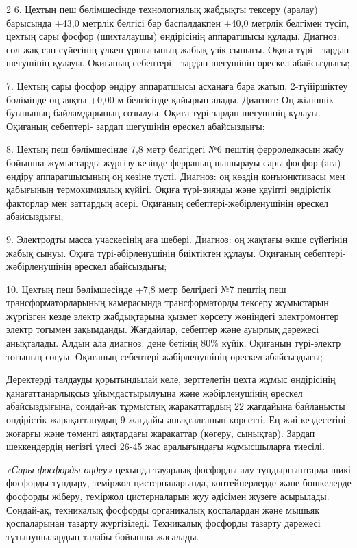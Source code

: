 \begin{multicols}{2}
6. Цехтың пеш бөлімшесінде технологиялық жабдықты тексеру (аралау)
барысында +43,0 метрлік белгісі бар баспалдақпен +40,0 метрлік белгімен
түсіп, цехтың сары фосфор (шихталаушы) өндірісінің аппаратшысы құлады.
Диагноз: сол жақ сан сүйегінің үлкен ұршығының жабық үзік сынығы. Оқиға
түрі - зардап шегушінің құлауы. Оқиғаның себептері - зардап шегушінің
өрескел абайсыздығы;

7. Цехтың сары фосфор өндіру аппаратшысы асханаға бара жатып,
2-түйіршіктеу бөлімінде оң аяқты +0,00 м белгісінде қайырып алады.
Диагноз: Оң жіліншік буынының байламдарының созылуы. Оқиға түрі-зардап
шегушінің құлауы. Оқиғаның себептері- зардап шегушінің өрескел
абайсыздығы;

8. Цехтың пеш бөлімшесінде 7,8 метр белгідегі №6 пештің ферроледкасын
жабу бойынша жұмыстарды жүргізу кезінде ферраның шашырауы сары фосфор
(аға) өндіру аппаратшысының оң көзіне түсті. Диагноз: оң көздің
конъюнктивасы мен қабығының термохимиялық күйігі. Оқиға түрі-зиянды және
қауіпті өндірістік факторлар мен заттардың әсері. Оқиғаның
себептері-жәбірленушінің өрескел абайсыздығы;

9. Электродты масса учаскесінің аға шебері. Диагноз: оң жақтағы өкше
сүйегінің жабық сынуы. Оқиға түрі-әбірленушінің биіктіктен құлауы.
Оқиғаның себептері-жәбірленушінің өрескел абайсыздығы;

10. Цехтың пеш бөлімшесінде +7,8 метр белгідегі №7 пештің пеш
трансформаторларының камерасында трансформаторды тексеру жұмыстарын
жүргізген кезде электр жабдықтарына қызмет көрсету жөніндегі
электромонтер электр тогымен зақымданды. Жағдайлар, себептер және
ауырлық дәрежесі анықталады. Алдын ала диагноз: дене бетінің 80\% күйік.
Оқиғаның түрі-электр тогының соғуы. Оқиғаның себептері-жәбірленушінің
өрескел абайсыздығы;

Деректерді талдауды қорытындылай келе, зерттелетін цехта жұмыс
өндірісінің қанағаттанарлықсыз ұйымдастырылуына және жәбірленушінің
өрескел абайсыздығына, сондай-ақ тұрмыстық жарақаттардың 22 жағдайына
байланысты өндірістік жарақаттанудың 9 жағдайы анықталғанын көрсетті. Ең
жиі кездесетіні-жоғарғы және төменгі аяқтардағы жарақаттар (көгеру,
сынықтар). Зардап шеккендердің негізгі үлесі 26-45 жас аралығындағы
жұмысшыларға тиесілі.

\emph{«Сары фосфорды өңдеу»} цехында тауарлық фосфорды алу
тұндырғыштарда шикі фосфорды тұндыру, теміржол цистерналарында,
контейнерлерде және бөшкелерде фосфорды жіберу, теміржол цистерналарын
жуу әдісімен жүзеге асырылады. Сондай-ақ, техникалық фосфорды
органикалық қоспалардан және мышьяк қоспаларынан тазарту жүргізіледі.
Техникалық фосфорды тазарту дәрежесі тұтынушылардың талабы бойынша
жасалады.


\end{multicols}
